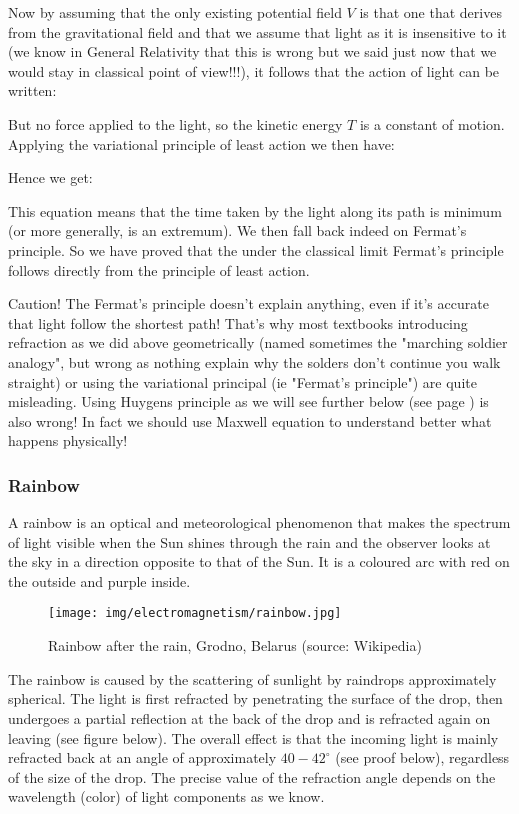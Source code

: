 	Now by assuming that the only existing potential field $V$ is that one that derives from the gravitational field and that we assume that light as it is insensitive to it (we know in General Relativity that this is wrong but we said just now that we would stay in classical point of view!!!), it follows that the action of light can be written:
	
	But no force applied to the light, so the kinetic energy $T$ is a constant of motion. Applying  the variational principle of least action we then have:
	
	Hence we get:
	
	This equation means that the time taken by the light along its path is minimum (or more generally, is an extremum). We then fall back indeed on Fermat's principle. So we have proved that the under the classical limit  Fermat's principle follows directly from the principle of least action.
	
	\begin{tcolorbox}[colback=red!5,borderline={1mm}{2mm}{red!5},arc=0mm,boxrule=0pt]
	\bcbombe Caution! The Fermat's principle doesn't explain anything, even if it's accurate that light follow the shortest path! That's why most textbooks introducing refraction as we did above geometrically (named sometimes the "marching soldier analogy", but wrong as nothing explain why the solders don't continue you walk straight) or using the variational principal (ie "Fermat's principle") are quite misleading. Using Huygens principle as we will see further below (see page \pageref{Huygens principle}) is also wrong! In fact we should use Maxwell equation to understand better what happens physically!
	\end{tcolorbox}

	\pagebreak
	\subsubsection{Rainbow}
	A rainbow is an optical and meteorological phenomenon that makes the spectrum of light visible  when the Sun shines through the rain and the observer looks at the sky in a direction opposite to that of the Sun. It is a coloured arc with red on the outside and purple inside.
	\begin{figure}[H]
		\centering
		\texttt{[image: img/electromagnetism/rainbow.jpg]}
		\caption[Rainbow after the rain]{Rainbow after the rain, Grodno, Belarus (source: Wikipedia)}
	\end{figure}
	The rainbow is caused by the scattering of sunlight by raindrops approximately spherical. The light is first refracted by penetrating the surface of the drop, then undergoes a partial reflection at the back of the drop and is refracted again on leaving (see figure below). The overall effect is that the incoming light is mainly refracted back at an angle of approximately $40-42^\circ$  (see proof below), regardless of the size of the drop. The precise value of the refraction angle depends on the wavelength (color) of light components as we know. 

